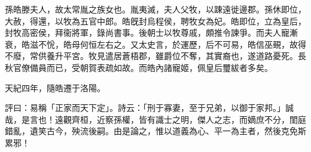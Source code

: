 \begin{pinyinscope}
 
 
 孫皓滕夫人，故太常胤之族女也。胤夷滅，夫人父牧，以踈遠徙邊郡。孫休即位，大赦，得還，以牧為五官中郎。皓旣封烏程侯，聘牧女為妃。皓即位，立為皇后，封牧高密侯，拜衞將軍，錄尚書事。後朝士以牧尊戚，頗推令諫爭。而夫人寵漸衰，皓滋不恱，皓母何恒左右之。又太史言，於運歷，后不可易，皓信巫覡，故得不廢，常供養升平宮。牧見遣居蒼梧郡，雖爵位不奪，其實裔也，遂道路憂死。長秋官僚備員而已，受朝賀表疏如故。而皓內諸寵姬，佩皇后璽紱者多矣。
 
 
 天紀四年，隨皓遷于洛陽。
 
 
 
 
 評曰：易稱「正家而天下定」。詩云：「刑于寡妻，至于兄弟，以御于家邦。」誠哉，是言也！遠觀齊桓，近察孫權，皆有識士之明，傑人之志，而嫡庶不分，閨庭錯亂，遺笑古今，殃流後嗣。由是論之，惟以道義為心、平一為主者，然後克免斯累邪！
 
 
\end{pinyinscope}